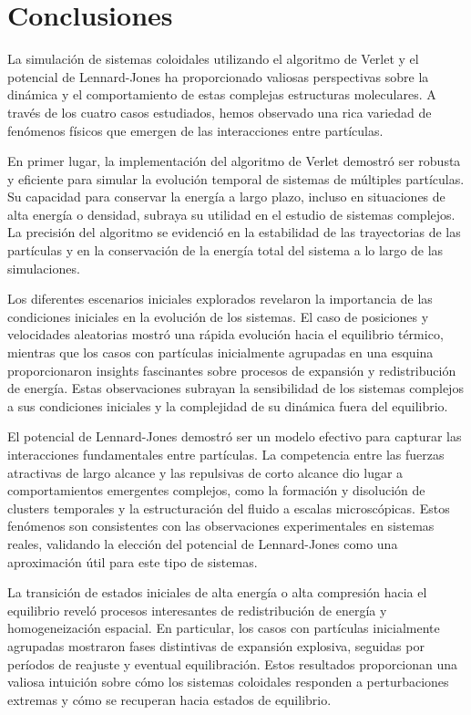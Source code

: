 \documentclass[twocolumn]{article}
\begin{document}
\section{Conclusiones}

La simulación de sistemas coloidales utilizando el algoritmo de Verlet y el potencial de Lennard-Jones ha proporcionado valiosas perspectivas sobre la dinámica y el comportamiento de estas complejas estructuras moleculares. A través de los cuatro casos estudiados, hemos observado una rica variedad de fenómenos físicos que emergen de las interacciones entre partículas.

En primer lugar, la implementación del algoritmo de Verlet demostró ser robusta y eficiente para simular la evolución temporal de sistemas de múltiples partículas. Su capacidad para conservar la energía a largo plazo, incluso en situaciones de alta energía o densidad, subraya su utilidad en el estudio de sistemas complejos. La precisión del algoritmo se evidenció en la estabilidad de las trayectorias de las partículas y en la conservación de la energía total del sistema a lo largo de las simulaciones.

Los diferentes escenarios iniciales explorados revelaron la importancia de las condiciones iniciales en la evolución de los sistemas. El caso de posiciones y velocidades aleatorias mostró una rápida evolución hacia el equilibrio térmico, mientras que los casos con partículas inicialmente agrupadas en una esquina proporcionaron insights fascinantes sobre procesos de expansión y redistribución de energía. Estas observaciones subrayan la sensibilidad de los sistemas complejos a sus condiciones iniciales y la complejidad de su dinámica fuera del equilibrio.

El potencial de Lennard-Jones demostró ser un modelo efectivo para capturar las interacciones fundamentales entre partículas. La competencia entre las fuerzas atractivas de largo alcance y las repulsivas de corto alcance dio lugar a comportamientos emergentes complejos, como la formación y disolución de clusters temporales y la estructuración del fluido a escalas microscópicas. Estos fenómenos son consistentes con las observaciones experimentales en sistemas reales, validando la elección del potencial de Lennard-Jones como una aproximación útil para este tipo de sistemas.

La transición de estados iniciales de alta energía o alta compresión hacia el equilibrio reveló procesos interesantes de redistribución de energía y homogeneización espacial. En particular, los casos con partículas inicialmente agrupadas mostraron fases distintivas de expansión explosiva, seguidas por períodos de reajuste y eventual equilibración. Estos resultados proporcionan una valiosa intuición sobre cómo los sistemas coloidales responden a perturbaciones extremas y cómo se recuperan hacia estados de equilibrio.
\end{document}
